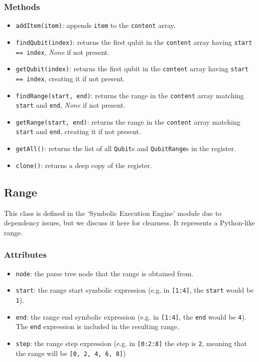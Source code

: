 \documentclass[12pt,a4paper]{report}
\theoremstyle{definition}
\theoremstyle{definition}
\theoremstyle{definition}
\begin{document}
\subsubsection{Methods}
\begin{itemize}
    \itemsep 0em
    \item \texttt{addItem(item)}: appends \texttt{item} to the \texttt{content} array.
    \item \texttt{findQubit(index)}: returns the first qubit in the \texttt{content} array having \texttt{start == index}, \textit{None} if not present.
    \item \texttt{getQubit(index)}: returns the first qubit in the \texttt{content} array having \texttt{start == index}, creating it if not present.
    \item \texttt{findRange(start, end)}: returns the range in the \texttt{content} array matching \texttt{start} and \texttt{end}, \textit{None} if not present.
    \item \texttt{getRange(start, end)}: returns the range in the \texttt{content} array matching \texttt{start} and \texttt{end}, creating it if not present.
    \item \texttt{getAll()}: returns the list of all \texttt{Qubit}s and \texttt{QubitRange}s in the register.
    \item \texttt{clone()}: returns a deep copy of the register.
\end{itemize}

\subsection{Range}
This class is defined in the `Symbolic Execution Engine' module due to dependency issues, but we discuss it here for clearness. It represents a Python-like range.
\subsubsection{Attributes}
\begin{itemize}
    \itemsep 0em
    \item \texttt{node}: the parse tree node that the range is obtained from.
    \item \texttt{start}: the range start symbolic expression (e.g. in \texttt{[1:4]}, the \texttt{start} would be \texttt{1}).
    \item \texttt{end}: the range end symbolic expression (e.g. in \texttt{[1:4]}, the \texttt{end} would be \texttt{4}). The \texttt{end} expression is included in the resulting range.
    \item \texttt{step}: the range step expression (e.g. in \texttt{[0:2:8]} the step is \texttt{2}, meaning that the range will be \texttt{[0, 2, 4, 6, 8]})
\end{itemize}
\end{document}
